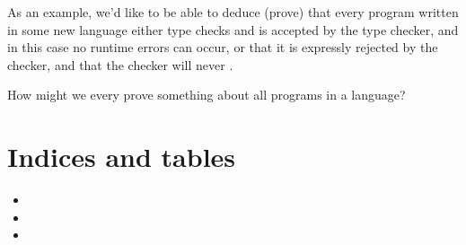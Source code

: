 \documentclass[letterpaper,10pt,english]{sphinxmanual}
\begin{document}
As an example, we’d like to be able to deduce (prove) that every
program written in some new language either type checks and is
accepted by the type checker, and in this case no runtime errors can
occur, or that it is expressly rejected by the checker, and that the
checker will never .

How might we every prove something about all programs in a language?


\chapter{Indices and tables}
\label{\detokenize{index:indices-and-tables}}\begin{itemize}
\item {} 

\item {} 

\item {} 

\end{itemize}



\renewcommand{\indexname}{Index}
\printindex
\end{document}
